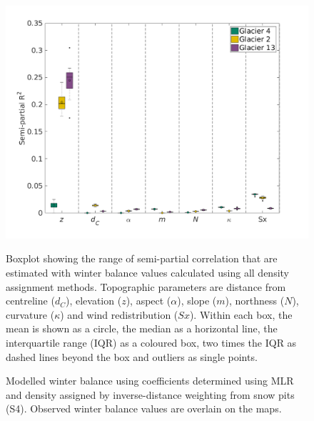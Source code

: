 \documentclass{sfuthesis}
\newcommand{\params}{Topographic parameters are distance from centreline ($d_C$), elevation ($z$), aspect ($\alpha$), slope ($m$), northness ($N$), curvature ($\kappa$) and wind redistribution ($Sx$). }
\newcommand{\boxplot}{Within each box, the mean is shown as a circle, the median as a horizontal line, the interquartile range (IQR) as a coloured box, two times the IQR as dashed lines beyond the box and outliers as single points. }
\newcommand{\swedots}{Observed winter balance values are overlain on the maps. }
\begin{document}
\begin{figure}[H]
	\centering
	\includegraphics[width =1 \textwidth]{MLRsemiR2_DensityOpts.png}\\
	\caption{Boxplot showing the range of semi-partial correlation that are estimated with winter balance values calculated using all density assignment methods. \params \boxplot }
	\label{fig:MLRsemiR2_densityOptions}
\end{figure} 

\begin{figure}[H]
	\caption{Modelled winter balance using coefficients determined using MLR and density assigned by inverse-distance weighting from snow pits (S4). \swedots}
	\label{fig:MLRmodelledSWE}
\end{figure}
\end{document}
